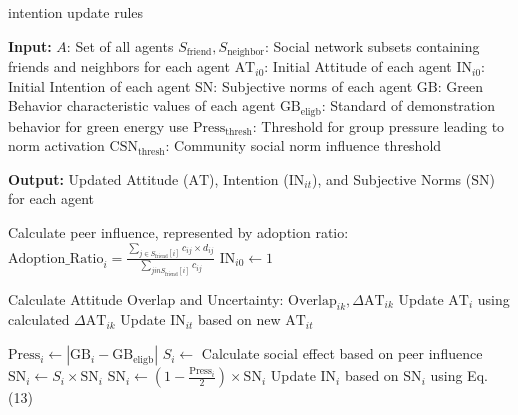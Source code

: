 \begin{algorithm}
\caption{intention update rules}
\begin{algorithmic}[1]
\State \textbf{Input:}
\State $A$: Set of all agents
\State $S_{\text{friend}}, S_{\text{neighbor}}$: Social network subsets containing friends and neighbors for each agent
\State $\text{AT}_{i0}$: Initial Attitude of each agent
\State $\text{IN}_{i0}$: Initial Intention of each agent
\State $\text{SN}$: Subjective norms of each agent
\State $\text{GB}$: Green Behavior characteristic values of each agent
\State $\text{GB}_{\text{eligb}}$: Standard of demonstration behavior for green energy use
\State $\text{Press}_{\text{thresh}}$: Threshold for group pressure leading to norm activation
\State $\text{CSN}_{\text{thresh}}$: Community social norm influence threshold

\State \textbf{Output:}
\State Updated Attitude ($\text{AT}$), Intention ($\text{IN}_{it}$), and Subjective Norms ($\text{SN}$) for each agent

    \State Calculate peer influence, represented by adoption ratio:
    \State $\text{Adoption\_Ratio}_i = \frac{\sum_{j \in S_{\text{friend}}[i]} c_{ij} \times d_{ij}}{\sum_{j in S_{\text{friend}}[i]} c_{ij}}$ 
        \State $\text{IN}_{i0} \gets 1$ 
    \EndIf

        \State Calculate Attitude Overlap and Uncertainty:
        \State $\text{Overlap}_{ik}, \Delta \text{AT}_{ik}$ 
            \State Update $\text{AT}_i$ using calculated $\Delta \text{AT}_{ik}$
        \EndIf
    \EndFor
    \State Update $\text{IN}_{it}$ based on new $\text{AT}_{it}$ 

    \State $\text{Press}_i \gets |\text{GB}_i - \text{GB}_{\text{eligb}}|$ 
            \State $S_i \gets$ Calculate social effect based on peer influence 
            \State $\text{SN}_i \gets S_i \times \text{SN}_i$ 
            \State $\text{SN}_i \gets (1 - \frac{\text{Press}_i}{2}) \times \text{SN}_i$ 
        \EndIf
        \State Update $\text{IN}_i$ based on $\text{SN}_i$ using Eq. (13)
    \EndIf
\EndFor
\EndProcedure
\end{algorithmic}
\end{algorithm}

